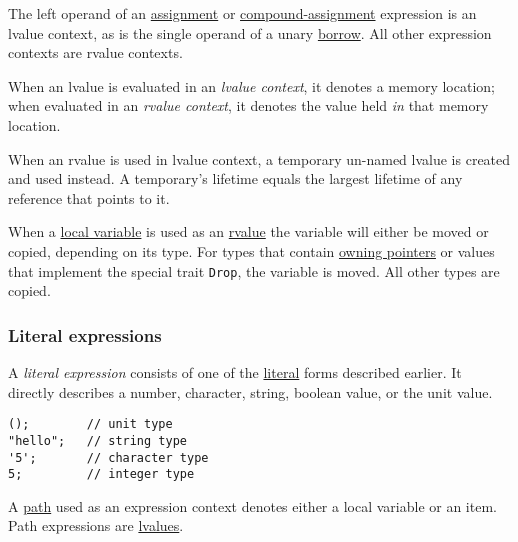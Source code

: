 \documentclass[]{article}
\begin{document}
The left operand of an \hyperref[assignment-expressions]{assignment} or
\hyperref[compound-assignment-expressions]{compound-assignment}
expression is an lvalue context, as is the single operand of a unary
\hyperref[unary-operator-expressions]{borrow}. All other expression
contexts are rvalue contexts.

When an lvalue is evaluated in an \emph{lvalue context}, it denotes a
memory location; when evaluated in an \emph{rvalue context}, it denotes
the value held \emph{in} that memory location.

When an rvalue is used in lvalue context, a temporary un-named lvalue is
created and used instead. A temporary's lifetime equals the largest
lifetime of any reference that points to it.


When a \hyperref[memory-slots]{local variable} is used as an
\hyperref[lvalues-rvalues-and-temporaries]{rvalue} the variable will
either be moved or copied, depending on its type. For types that contain
\hyperref[pointer-types]{owning pointers} or values that implement the
special trait \texttt{Drop}, the variable is moved. All other types are
copied.

\subsubsection{Literal expressions}\label{literal-expressions}

A \emph{literal expression} consists of one of the
\hyperref[literals]{literal} forms described earlier. It directly
describes a number, character, string, boolean value, or the unit value.

\begin{verbatim}
();        // unit type
"hello";   // string type
'5';       // character type
5;         // integer type
\end{verbatim}


A \hyperref[paths]{path} used as an expression context denotes either a
local variable or an item. Path expressions are
\hyperref[lvalues-rvalues-and-temporaries]{lvalues}.
\end{document}

